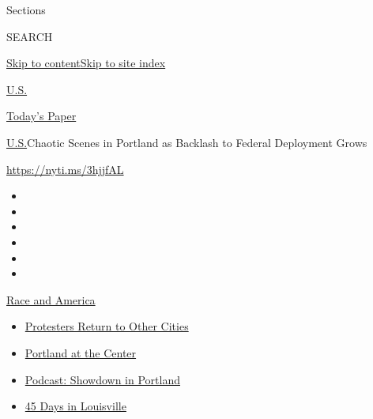 Sections

SEARCH

\protect\hyperlink{site-content}{Skip to
content}\protect\hyperlink{site-index}{Skip to site index}

\href{https://www.nytimes.com/section/us}{U.S.}

\href{https://myaccount.nytimes.com/auth/login?response_type=cookie\&client_id=vi}{}

\href{https://www.nytimes.com/section/todayspaper}{Today's Paper}

\href{/section/us}{U.S.}\textbar{}Chaotic Scenes in Portland as Backlash
to Federal Deployment Grows

\url{https://nyti.ms/3hjjfAL}

\begin{itemize}
\item
\item
\item
\item
\item
\item
\end{itemize}

\href{https://www.nytimes.com/news-event/george-floyd-protests-minneapolis-new-york-los-angeles?action=click\&pgtype=Article\&state=default\&region=TOP_BANNER\&context=storylines_menu}{Race
and America}

\begin{itemize}
\tightlist
\item
  \href{https://www.nytimes.com/2020/07/26/us/protests-portland-seattle-trump.html?action=click\&pgtype=Article\&state=default\&region=TOP_BANNER\&context=storylines_menu}{Protesters
  Return to Other Cities}
\item
  \href{https://www.nytimes.com/2020/07/24/us/portland-oregon-protests-white-race.html?action=click\&pgtype=Article\&state=default\&region=TOP_BANNER\&context=storylines_menu}{Portland
  at the Center}
\item
  \href{https://www.nytimes.com/2020/07/23/podcasts/the-daily/portland-protests.html?action=click\&pgtype=Article\&state=default\&region=TOP_BANNER\&context=storylines_menu}{Podcast:
  Showdown in Portland}
\item
  \href{https://www.nytimes.com/interactive/2020/07/16/us/black-lives-matter-protests-louisville-breonna-taylor.html?action=click\&pgtype=Article\&state=default\&region=TOP_BANNER\&context=storylines_menu}{45
  Days in Louisville}
\end{itemize}

